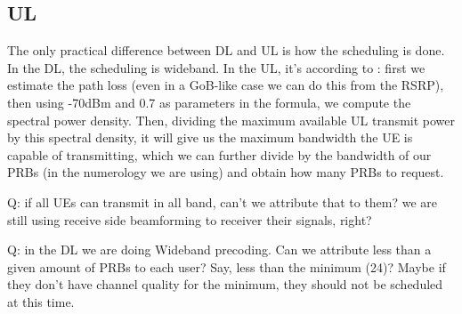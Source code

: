 \begin{comment}
STEPS AFTER KNOWING WHICH USERS TO CO-SCHEDULE AND THEIR PRECODERS.

Find the TBS from the MCSs and #PRBs. At the moment, there’s only 1 TB, with the size of the total amount of bits that can go over the channel. But it’s possible to configure a certain TBS such that there are multiple TBs going over. Note that one flips a coin for each TB, therefore the impact of (bad) luck is attenuated since the experienced throughput will represent much more the experienced BLER.
6- Generate the transport blocks (size, start packet, end packet idx) in an array associated with a certain buffer.
7- Compute what happened in the actual transmission: a) compute the experienced SINR of all PRBs for all buffers; b) aggregate over all the PRBs into a effective SINR; c) compare with the estimated SINR and adjust the outer loop parameter; d) compute the experienced BLER; 
8- Transport Block Computations: a) Flip a biased coin based on the BLER; b) Figure which TBs have errors; c) the TBs with errors are not removed from the buffer, the others are; d) Compute realised throughputs;
9- Update the average throughputs with the realised throughputs;
10- Update tti stats. Note that every time functions act on buffers, stats are updated, being dropped frames or sent TBs.

\end{comment}


\subsection{UL}

The only practical difference between \acs{DL} and \acs{UL} is how the scheduling is done. In the DL, the scheduling is wideband. In the UL, it's according to \cite{4657149}: first we estimate the path loss (even in a GoB-like case we can do this from the RSRP), then using -70dBm and 0.7 as parameters in the formula, we compute the spectral power density. Then, dividing the maximum available UL transmit power by this spectral density, it will give us the maximum bandwidth the UE is capable of transmitting, which we can further divide by the bandwidth of our PRBs (in the numerology we are using) and obtain how many PRBs to request.

Q: if all UEs can transmit in all band, can't we attribute that to them? we are still using receive side beamforming to receiver their signals, right?

Q: in the DL we are doing Wideband precoding. Can we attribute less than a given amount of PRBs to each user? Say, less than the minimum (24)? Maybe if they don't have channel quality for the minimum, they should not be scheduled at this time.







